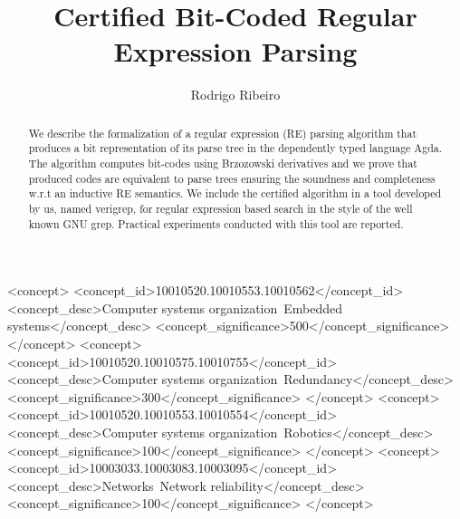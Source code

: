 \documentclass[sigplan, anonymous, review]{acmart}
\def\resethooks{%
  \global\let\SaveRestoreHook\empty
  \global\let\ColumnHook\empty}
\let\hspre\empty
\let\hspost\empty
\theoremstyle{definition}
\newcommand{\V}[1]{\purple{\mathit{#1}}}
\begin{document}
\title{Certified Bit-Coded Regular Expression Parsing}

\author{Rodrigo Ribeiro}

\begin{abstract}
We describe the formalization of a regular expression (RE) parsing
algorithm that produces a bit representation of its parse tree
in the dependently typed language Agda. The algorithm computes
bit-codes using Brzozowski derivatives and we prove that 
produced codes are equivalent to parse trees ensuring the 
soundness and completeness w.r.t an inductive RE semantics.
We include the certified algorithm in a tool developed by us, 
named verigrep, for regular expression based search in the style 
of the well known GNU grep. Practical experiments conducted with this tool 
are reported.
\end{abstract}
%
%
\begin{CCSXML}\begin{hscode}\SaveRestoreHook
\column{B}{@{}>{\hspre}l<{\hspost}@{}}%
\column{E}{@{}>{\hspre}l<{\hspost}@{}}%
\>[B]{}\V{ccs2012>}{}\<[E]%
\ColumnHook
\end{hscode}\resethooks
 <concept>
  <concept_id>10010520.10010553.10010562</concept_id>
  <concept_desc>Computer systems organization~Embedded systems</concept_desc>
  <concept_significance>500</concept_significance>
 </concept>
 <concept>
  <concept_id>10010520.10010575.10010755</concept_id>
  <concept_desc>Computer systems organization~Redundancy</concept_desc>
  <concept_significance>300</concept_significance>
 </concept>
 <concept>
  <concept_id>10010520.10010553.10010554</concept_id>
  <concept_desc>Computer systems organization~Robotics</concept_desc>
  <concept_significance>100</concept_significance>
 </concept>
 <concept>
  <concept_id>10003033.10003083.10003095</concept_id>
  <concept_desc>Networks~Network reliability</concept_desc>
  <concept_significance>100</concept_significance>
 </concept>\begin{hscode}\SaveRestoreHook
\column{B}{@{}>{\hspre}l<{\hspost}@{}}%
\column{E}{@{}>{\hspre}l<{\hspost}@{}}%
\>[B]{}\V{/ccs2012>}{}\<[E]%
\ColumnHook
\end{hscode}\resethooks
\end{CCSXML}
\end{document}
